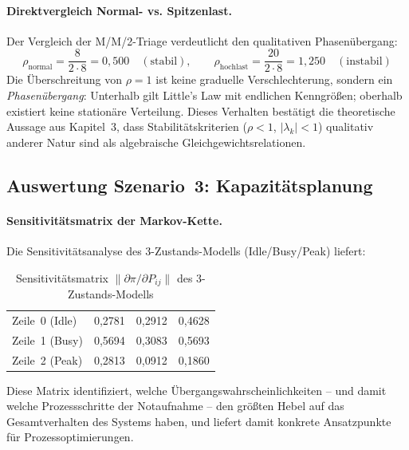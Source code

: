 ﻿\documentclass[a4paper,12pt]{report}
\theoremstyle{definition}
\begin{document}
\paragraph{Direktvergleich Normal- vs. Spitzenlast.}
Der Vergleich der M/M/2-Triage verdeutlicht den qualitativen Phasenübergang:
\begin{equation}
	\rho_\text{normal} = \frac{8}{2 \cdot 8} = 0{,}500 \quad (\text{stabil}),
	\qquad
	\rho_\text{hochlast} = \frac{20}{2 \cdot 8} = 1{,}250 \quad (\text{instabil})
\end{equation}
Die Überschreitung von $\rho = 1$ ist keine graduelle Verschlechterung,
sondern ein \emph{Phasenübergang}: Unterhalb gilt Little's Law
mit endlichen Kenngrößen; oberhalb existiert keine stationäre Verteilung.
Dieses Verhalten bestätigt die theoretische Aussage aus Kapitel~3, dass
Stabilitätskriterien ($\rho < 1$, $|\lambda_k| < 1$) qualitativ anderer
Natur sind als algebraische Gleichgewichtsrelationen.

\subsection{Auswertung Szenario~3: Kapazitätsplanung}

\paragraph{Sensitivitätsmatrix der Markov-Kette.}
Die Sensitivitätsanalyse des 3-Zustands-Modells (Idle/Busy/Peak) liefert:

\begin{table}[H]
	\centering
	\begin{tabular}{@{}lrrr@{}}
		\toprule
		& \boldmath{$\partial\pi / \partial P_{i,0}$} &
		\boldmath{$\partial\pi / \partial P_{i,1}$} &
		\boldmath{$\partial\pi / \partial P_{i,2}$} \\
		\midrule
		Zeile~0 (Idle) & 0{,}2781 & 0{,}2912 & 0{,}4628 \\
		Zeile~1 (Busy) & 0{,}5694 & 0{,}3083 & 0{,}5693 \\
		Zeile~2 (Peak) & 0{,}2813 & 0{,}0912 & 0{,}1860 \\
		\bottomrule
	\end{tabular}
	\caption{Sensitivitätsmatrix $\|\partial\pi/\partial P_{ij}\|$ des 3-Zustands-Modells}
	\label{tab:sensitivitaet}
\end{table}

Diese Matrix identifiziert, welche Übergangswahrscheinlichkeiten -- und damit welche Prozessschritte der Notaufnahme -- den größten Hebel auf das Gesamtverhalten des Systems haben, und liefert damit konkrete Ansatzpunkte für Prozessoptimierungen.
\end{document}
